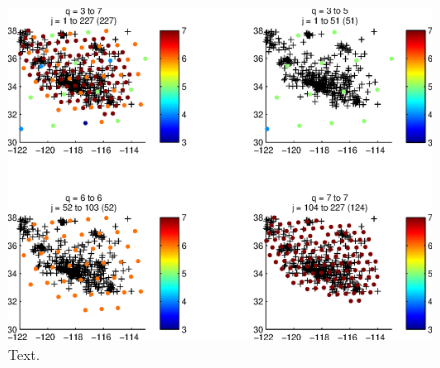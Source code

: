 \documentclass[11pt,titlepage,fleqn]{article}
\begin{document}
\begin{figure}
\includegraphics[width=16cm]{fig2D_A7.eps}
\caption[]
{{
Text.
\label{fig:2D_A7}
}}
\end{figure}
\end{document}
